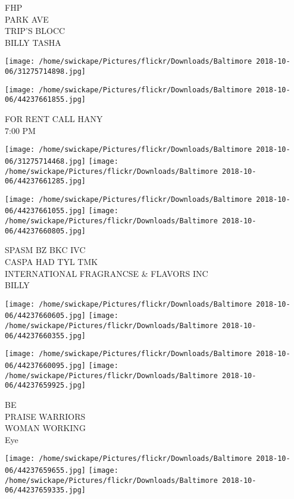 \documentclass[10pt,letterpaper]{article}
\begin{document}
FHP\\
PARK AVE\\
TRIP'S BLOCC\\
BILLY TASHA\\
\pagebreak

\texttt{[image: /home/swickape/Pictures/flickr/Downloads/Baltimore 2018-10-06/31275714898.jpg]}

\vspace{0.25in}
\texttt{[image: /home/swickape/Pictures/flickr/Downloads/Baltimore 2018-10-06/44237661855.jpg]}

FOR RENT CALL HANY\\
7:00 PM\\
\pagebreak

\texttt{[image: /home/swickape/Pictures/flickr/Downloads/Baltimore 2018-10-06/31275714468.jpg]}
\texttt{[image: /home/swickape/Pictures/flickr/Downloads/Baltimore 2018-10-06/44237661285.jpg]}

\texttt{[image: /home/swickape/Pictures/flickr/Downloads/Baltimore 2018-10-06/44237661055.jpg]}
\texttt{[image: /home/swickape/Pictures/flickr/Downloads/Baltimore 2018-10-06/44237660805.jpg]}

SPASM BZ BKC IVC\\
CASPA HAD TYL TMK\\
INTERNATIONAL FRAGRANCSE \& FLAVORS INC\\
BILLY\\
\pagebreak

\texttt{[image: /home/swickape/Pictures/flickr/Downloads/Baltimore 2018-10-06/44237660605.jpg]}
\texttt{[image: /home/swickape/Pictures/flickr/Downloads/Baltimore 2018-10-06/44237660355.jpg]}

\texttt{[image: /home/swickape/Pictures/flickr/Downloads/Baltimore 2018-10-06/44237660095.jpg]}
\texttt{[image: /home/swickape/Pictures/flickr/Downloads/Baltimore 2018-10-06/44237659925.jpg]}

BE\\
PRAISE WARRIORS\\
WOMAN WORKING\\
Eye\\
\pagebreak

\texttt{[image: /home/swickape/Pictures/flickr/Downloads/Baltimore 2018-10-06/44237659655.jpg]}
\texttt{[image: /home/swickape/Pictures/flickr/Downloads/Baltimore 2018-10-06/44237659335.jpg]}
\end{document}
